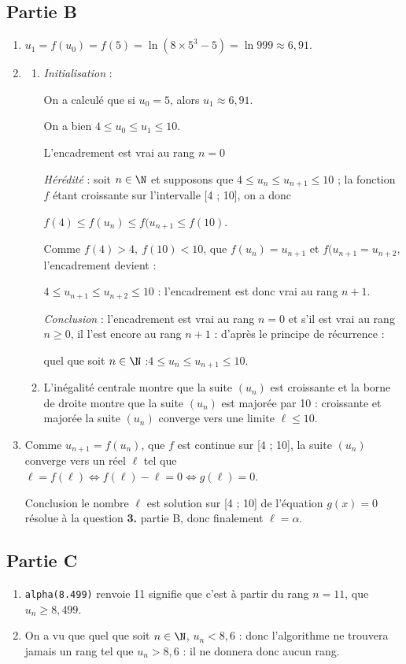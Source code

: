 \subsection*{Partie B}
\begin{enumerate}
	\item $u_1 = f(u_0) = f(5) = \ln \left(8 \times 5^3 - 5\right) = \ln 999 \approx 6,91$.
	\item \begin{enumerate}
		\item \emph{Initialisation} :

		On a calculé que si $u_0 = 5$, alors $u_1 \approx 6,91$.

		On a bien  $4 \leqslant u_0 \leqslant u_1 \leqslant 10$.

		L'encadrement est vrai au rang $n = 0$

		\emph{Hérédité} : soit $n \in \N$ et supposons que $4 \leqslant u_n \leqslant u_{n+1} \leqslant 10$ ; la fonction $f$ étant croissante sur l'intervalle [4 ; 10], on a donc

		$f(4) \leqslant f(u_n) \leqslant f(u_{n+1} \leqslant f(10)$.

		Comme $f(4) > 4, \: f(10) < 10$, que $f(u_n) = u_{n+1}$ et $f(u_{n+1} = u_{n+2}$, l'encadrement devient :

		$4 \leqslant u_{n+1} \leqslant u_{n+2} \leqslant 10$ : l'encadrement est donc vrai au rang $n + 1$.

		\emph{Conclusion} : l'encadrement est vrai au rang $n = 0$ et s'il est vrai au rang $n \geqslant 0$, il l'est encore au rang $n + 1$ : d'après le principe de récurrence :

		quel que soit $n \in \N$ :\quad $4 \leqslant u_n \leqslant u_{n+1} \leqslant 10$.

		\item L'inégalité centrale montre que la suite $(u_n)$ est croissante et la borne de droite montre que la suite $(u_n)$ est majorée par 10 : croissante et majorée la suite $(u_n)$ converge vers une limite $\ell \leqslant 10$.
	\end{enumerate}

	\item Comme $u_{n+1} = f(u_n)$, que $f$ est continue sur [4 ; 10], la suite $(u_n)$ converge vers un réel $\ell$ tel que $\ell = f(\ell) \iff f(\ell) - \ell = 0 \iff g(\ell)  = 0$.

	Conclusion le nombre $\ell$ est solution sur [4 ; 10] de l'équation $g(x) = 0$ résolue à la question \textbf{3.} partie B, donc finalement $\ell = \alpha$.
\end{enumerate}

\subsection*{Partie C}
\begin{enumerate}
	\item \texttt{alpha(8.499)} renvoie  11 signifie que c'est à partir du rang $n = 11$, que $u_n \geqslant 8,499$.

	\item On a vu que quel que soit $n \in \N$, \: $u_n < 8,6$ : donc l'algorithme ne trouvera jamais un rang tel que $u_n > 8,6$ : il ne donnera donc aucun rang.
\end{enumerate}
